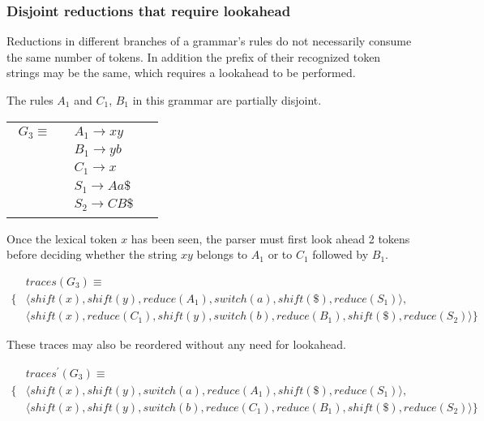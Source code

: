 \documentclass[envcountsame,runningheads]{llncs}
\begin{document}
\subsubsection{Disjoint reductions that require lookahead}
Reductions in different branches of a grammar's rules do not necessarily consume the same number of tokens. 
In addition the prefix of their recognized token strings may be the same, which requires a lookahead to be performed.

The rules $A_1$ and $C_1$, $B_1$ in this grammar are partially disjoint.

\begin{tabular}[t]{cl}
\parbox{.3\textwidth}{
\begin{align*}
G_3 \equiv \quad & A_1 \rightarrow x y\\
                 & B_1 \rightarrow y b\\
                 & C_1 \rightarrow x\\
                 & S_1 \rightarrow A a \$\\
                 & S_2 \rightarrow C B \$
\end{align*}}
\parbox{.6\textwidth}{}
\end{tabular}

Once the lexical token $x$ has been seen, the parser must first look ahead 2 tokens before 
deciding whether the string $x y$ belongs to $A_1$ or to $C_1$ followed by $B_1$.

{\small\parbox{.3\textwidth}{\begin{align*}
&traces(G_3) \equiv \\
\{ & \langle shift(x), shift(y), reduce(A_1), switch(a), shift(\$), reduce(S_1) \rangle,\\
   & \langle shift(x), reduce(C_1), shift(y), switch(b), reduce(B_1), shift(\$), reduce(S_2) \rangle \}
\end{align*}}}

These traces may also be reordered without any need for lookahead.

{\small\parbox{.3\textwidth}{\begin{align*}
&traces^{\prime}(G_3) \equiv \\
\{ & \langle shift(x), shift(y), switch(a), reduce(A_1), shift(\$), reduce(S_1) \rangle,\\
   & \langle shift(x), shift(y), switch(b), reduce(C_1), reduce(B_1), shift(\$), reduce(S_2) \rangle \}
\end{align*}}}

\end{document}
